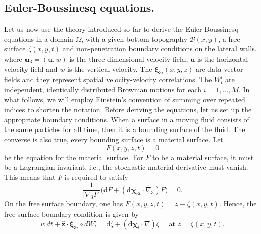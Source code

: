 \documentclass[11pt, oneside]{article}   	%
\numberwithin{equation}{section}
\theoremstyle{plain}
\theoremstyle{definition}
\theoremstyle{remark}
\newcommand{\<}{\langle}
\renewcommand{\>}{\rangle}
\def\rmd{{\mathrm{d}}}
\begin{document}
\subsection{Euler-Boussinesq equations.}
Let us now use the theory introduced so far to derive the Euler-Boussinesq equations in a domain $\Omega$, with a given bottom topography $\mathscr{B}(x,y)$, a free surface $\zeta(x,y,t)$ and non-penetration boundary conditions on the lateral walls.
where $\mathbf{u}_3=(\mathbf{u},w)$ is the three dimensional velocity field, $\mathbf{u}$ is the horizontal velocity field and $w$ is the vertical velocity. The $\boldsymbol\xi_{3i}(x,y,z)$ are data vector fields and they represent spatial velocity-velocity correlations. The $W_t^i$ are independent, identically distributed Brownian motions for each $i=1,\hdots,M$. In what follows, we will employ Einstein's convention of summing over repeated indices to shorten the notation. Before deriving the equations, let us set up the appropriate boundary conditions. When a surface in a moving fluid consists of the same particles for all time, then it is a bounding surface of the fluid. The converse is also true, every bounding surface is a material surface. Let
\begin{equation}
F(x,y,z,t) = 0
\end{equation}
be the equation for the material surface. For $F$ to be a material surface, it must be a Lagrangian invariant, i.e., the stochastic material derivative must vanish. This means that $F$ is required to satisfy
\begin{equation}
\frac{1}{|\nabla_3 F|}\big({\rmd}F + ({\rmd}\boldsymbol\chi_{3t}\cdot\nabla_3)F\big) = 0.
\end{equation}
On the free surface boundary, one has $F(x,y,z,t)=z-\zeta(x,y,t)$. Hence, the free surface boundary condition is given by
\begin{equation}\label{eq:freesurface}
w\,dt + \hat{\mathbf{z}}\cdot\boldsymbol \xi_{3i}\circ dW_t^i = {\rmd}\zeta + ({\rmd}\boldsymbol \chi_t\cdot\nabla)\zeta \quad \text{ at } z=\zeta(x,y,t).
\end{equation} 
\end{document}
